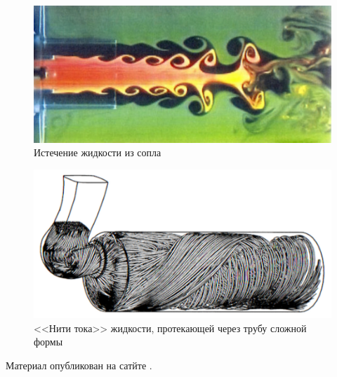 \begin{figure}[htp]
\centering
\includegraphics[width = 0.7\linewidth]{historyImg/jet_small.pdf}
\caption{Истечение жидкости из сопла}
\label{}
\end{figure}

\begin{figure}[htp]
\centering
\includegraphics[width=0.7\linewidth]{historyImg/flow_small.pdf}
\caption{<<Нити тока>> жидкости, протекающей через трубу сложной формы}
\label{}
\end{figure}
\newpage

Материал опубликован на сатйте \cite{history}.
